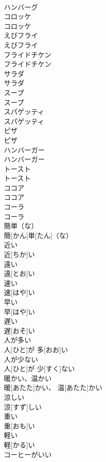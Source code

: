 \documentclass[8pt]{extreport}
\begin{document}
\begin{CJK}{UTF8}{min}
\\	ハンバーグ		
\\	コロッケ	
\\	コロッケ		
\\	えびフライ	
\\	えびフライ		
\\	フライドチケン	
\\	フライドチケン		
\\	サラダ	
\\	サラダ		
\\	スープ	
\\	スープ		
\\	スパゲッティ	
\\	スパゲッティ		
\\	ピザ	
\\	ピザ		
\\	ハンバーガー	
\\	ハンバーガー		
\\	トースト	
\\	トースト		
\\	ココア	
\\	ココア		
\\	コーラ	
\\	コーラ		
\\	簡単（な）	
\\	簡[かん]単[たん]（な）		
\\	近い	
\\	近[ちか]い		
\\	遠い	
\\	遠[とお]い		
\\	速い	
\\	速[はや]い		
\\	早い	
\\	早[はや]い		
\\	遅い	
\\	遅[おそ]い		
\\	人が多い	
\\	人[ひと]が 多[おお]い		
\\	人が少ない	
\\	人[ひと]が 少[すく]ない		
\\	暖かい、温かい	
\\	暖[あたた]かい、 温[あたた]かい		
\\	涼しい	
\\	涼[すず]しい		
\\	重い	
\\	重[おも]い		
\\	軽い	
\\	軽[かる]い		
\\	コーヒーがいい	

\end{CJK}
\end{document}
